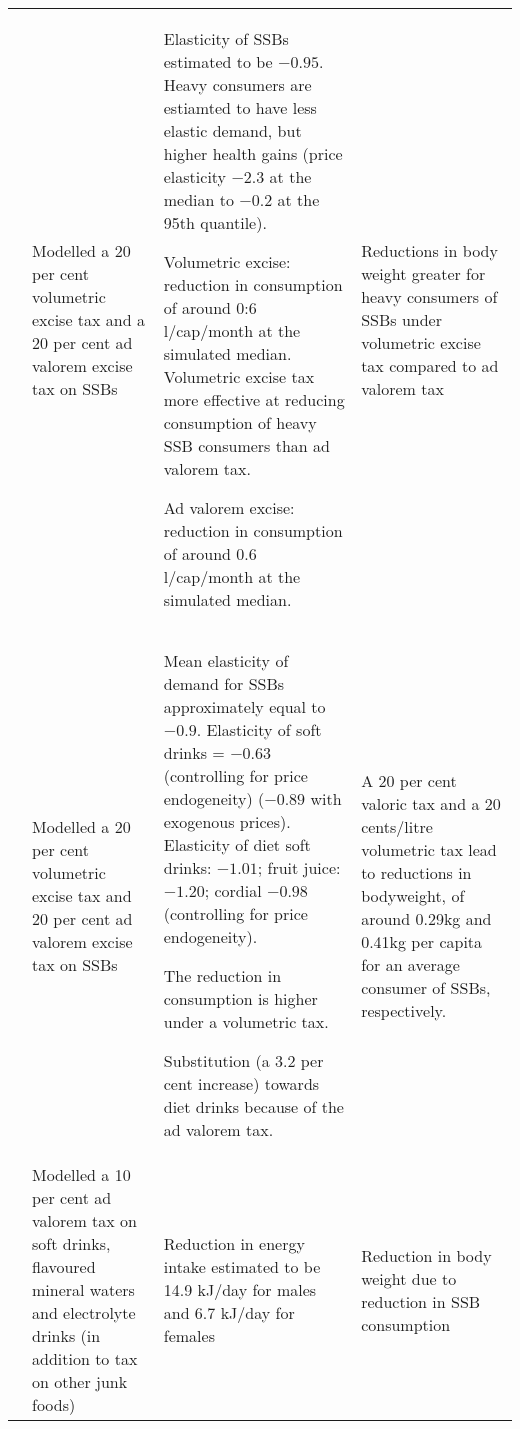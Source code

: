 \begin{longtable}{Xp{4.3cm}p{10.1cm}p{6.2cm}}
\textcite{Etile2015DoHighConsumers}  & Modelled a 20 per cent volumetric excise tax and a 20 per cent ad valorem excise tax on SSBs & Elasticity of SSBs estimated to be \(-0.95\). Heavy consumers are estiamted to have less elastic demand, but higher health gains (price elasticity $-$2.3 at the median to $-$0.2 at the 95th quantile).

Volumetric excise: reduction in consumption of around 0:6 l/cap/month at the simulated median. Volumetric excise tax more effective at reducing consumption of heavy SSB consumers than ad valorem tax.

Ad valorem excise: reduction in consumption of around 0.6 l/cap/month at the simulated median. & Reductions in body weight greater for heavy consumers of SSBs under volumetric excise tax compared to ad valorem tax \\
\textcite{Sharma2014effectstaxingsugarsweetened} & Modelled a 20 per cent volumetric excise tax and 20 per cent ad valorem excise tax on SSBs & Mean elasticity of demand for SSBs approximately equal to \(-0.9\). Elasticity of soft drinks = \(-0.63\) (controlling for price endogeneity) (\(-0.89\) with exogenous prices). Elasticity of diet soft drinks: \(-1.01\); fruit juice: \(-1.20\); cordial \(-0.98\) (controlling for price endogeneity).

The reduction in consumption is higher under a volumetric tax.

Substitution (a 3.2 per cent increase) towards diet drinks because of the ad valorem tax. & A 20 per cent valoric tax and a 20 cents/litre volumetric tax lead to reductions in bodyweight, of around 0.29kg and 0.41kg per capita for an average consumer of SSBs, respectively. \\
\textcite{Sacks2011Statesshouldstand} & Modelled a 10 per cent ad valorem tax on soft drinks, flavoured mineral waters and electrolyte drinks (in addition to tax on other junk foods) & Reduction in energy intake estimated to be 14.9 kJ/day for males and 6.7 kJ/day for females & Reduction in body weight due to reduction in SSB consumption \\

\end{longtable}